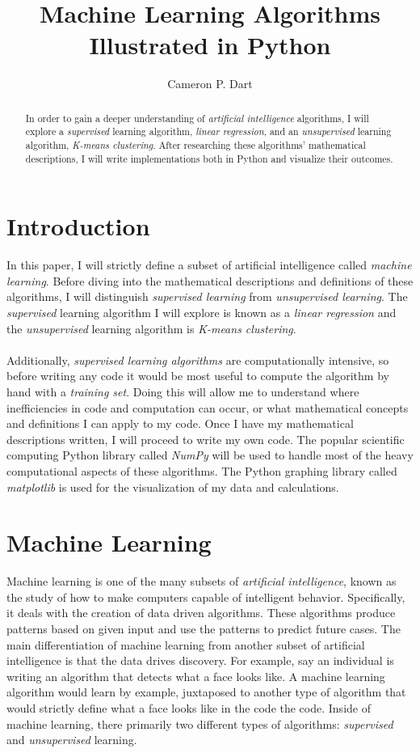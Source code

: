 \documentclass[12pt]{article}
\title{Machine Learning Algorithms Illustrated in Python}
\author{Cameron P. Dart}
\begin{document}
\maketitle

\begin{abstract}
In order to gain a deeper understanding of \textit{artificial intelligence} algorithms, I will explore a \textit{supervised} learning algorithm, \textit{linear regression}, and an \textit{unsupervised} learning algorithm, \textit{K-means clustering}. After researching these algorithms' mathematical descriptions, I will write implementations both in Python and visualize their outcomes.
\end{abstract}
\section{Introduction}
In this paper, I will strictly define a subset of artificial intelligence called \textit{machine learning}. Before diving into the mathematical descriptions and definitions of these algorithms, I will distinguish \textit{supervised learning} from \textit{unsupervised learning}. The \textit{supervised} learning algorithm I will explore is known as a \textit{linear regression} and the \textit{unsupervised} learning algorithm is \textit{K-means clustering}.\\ \\
 Additionally, \textit{supervised learning algorithms} are computationally intensive, so before writing any code it would be most useful to compute the algorithm by hand with a \textit{training set}. Doing this will allow me to understand where inefficiencies in code and computation can occur, or what mathematical concepts and definitions I can apply to my code. Once I have my mathematical descriptions written, I will proceed to write my own code. The popular scientific computing Python library called \textit{NumPy} \cite{NumPy} will be used to handle most of the heavy computational aspects of these algorithms. The Python graphing library called \textit{matplotlib} \cite{matplotlib} is used for the visualization of my data and calculations. 
\section{Machine Learning}
Machine learning is one of the many subsets of \textit{artificial intelligence}, known as the study of how to make computers capable of intelligent behavior. Specifically, it deals with the creation of data driven algorithms. These algorithms produce patterns based on given input and use the patterns to predict future cases. The main differentiation of machine learning from another subset of artificial intelligence is that the data drives discovery. For example, say an individual is writing an algorithm that detects what a face looks like. A machine learning algorithm would learn by example, juxtaposed to another type of algorithm that would strictly define what a face looks like in the code the code. Inside of machine learning, there primarily two different types of algorithms: \textit{supervised} and \textit{unsupervised} learning.
\end{document}
